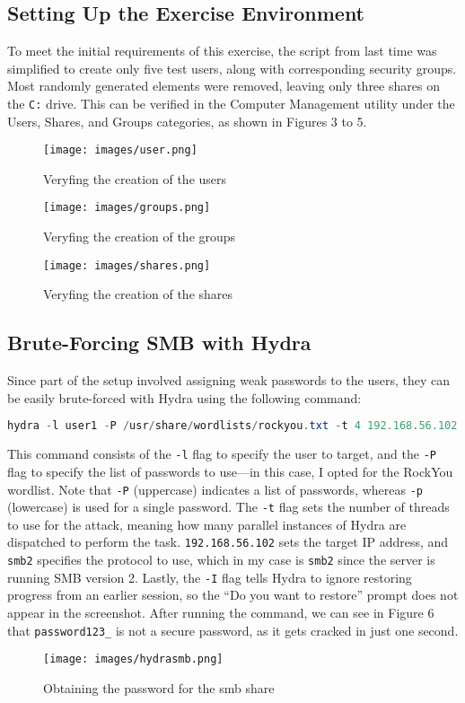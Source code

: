 \documentclass[a4paper]{article}
\newcommand{\abc}{\hfill \break}
\begin{document}
\subsection{Setting Up the Exercise Environment}
To meet the initial requirements of this exercise, the script from last time was simplified to create only five test users, along with corresponding security groups. Most randomly generated elements were removed, leaving only three shares on the \texttt{C:} drive. This can be verified in the Computer Management utility under the Users, Shares, and Groups categories, as shown in Figures 3 to 5.
\begin{figure}[h]
	\texttt{[image: images/user.png]}
	\centering
	\caption{Veryfing the creation of the users}
\end{figure}
\begin{figure}[h]
	\texttt{[image: images/groups.png]}
	\centering
	\caption{Veryfing the creation of the groups}
\end{figure}
\begin{figure}[h]
	\texttt{[image: images/shares.png]}
	\centering
	\caption{Veryfing the creation of the shares}
\end{figure}\abc
\subsection{Brute-Forcing SMB with Hydra}
Since part of the setup involved assigning weak passwords to the users, they can be easily brute-forced with Hydra using the following command:
\begin{lstlisting}[language=PowerShell]
hydra -l user1 -P /usr/share/wordlists/rockyou.txt -t 4 192.168.56.102 smb2 -I
\end{lstlisting}
This command consists of the \texttt{-l} flag to specify the user to target, and the \texttt{-P} flag to specify the list of passwords to use—in this case, I opted for the RockYou wordlist. Note that \texttt{-P} (uppercase) indicates a list of passwords, whereas \texttt{-p} (lowercase) is used for a single password. The \texttt{-t} flag sets the number of threads to use for the attack, meaning how many parallel instances of Hydra are dispatched to perform the task. \texttt{192.168.56.102} sets the target IP address, and \texttt{smb2} specifies the protocol to use, which in my case is \texttt{smb2} since the server is running SMB version 2. Lastly, the \texttt{-I} flag tells Hydra to ignore restoring progress from an earlier session, so the “Do you want to restore” prompt does not appear in the screenshot.\abc
After running the command, we can see in Figure 6 that \texttt{password123\_} is not a secure password, as it gets cracked in just one second.
\begin{figure}[h]
	\texttt{[image: images/hydrasmb.png]}
	\centering
	\caption{Obtaining the password for the smb share}
\end{figure}\abc
\newpage
\end{document}
